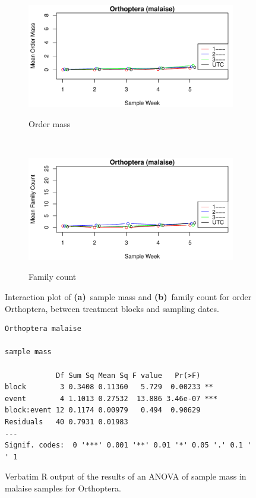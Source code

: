 \documentclass[10pt,letterpaper,twocolumn]{article}
\begin{document}
\begin{figure}[h]
	\centering
	\begin{subfigure}[b]{0.45\textwidth}
		\caption{Order mass}
		\includegraphics[width=\textwidth]{plots/blocks/interaction/mass/mass_malaise_Orthoptera_interplot.pdf}
		\label{fig:malaise_orthoptera_mass_interplot}
	\end{subfigure}
	~
	\begin{subfigure}[b]{0.45\textwidth}
		\caption{Family count}
		\includegraphics[width=\textwidth]{plots/blocks/interaction/family/family_malaise_Orthoptera_interplot.pdf}
		\label{fig:malaise_orthoptera_family_interplot}
	\end{subfigure}
	\caption{Interaction plot of \textbf{(a)}~sample mass and \textbf{(b)}~family count for order Orthoptera, between treatment blocks and sampling dates.}
	\label{fig:malaise_orthoptera_interplot}
	\smallskip
	\nointerlineskip
	\hrulefill
\end{figure}

\begin{figure}[h]
	\lstset{numbers=left}
	\lstset{xleftmargin=5mm,framexleftmargin=5mm}
	\begin{lstlisting}
Orthoptera malaise 

sample mass 

            Df Sum Sq Mean Sq F value   Pr(>F)    
block        3 0.3408 0.11360   5.729  0.00233 ** 
event        4 1.1013 0.27532  13.886 3.46e-07 ***
block:event 12 0.1174 0.00979   0.494  0.90629    
Residuals   40 0.7931 0.01983                     
---
Signif. codes:  0 '***' 0.001 '**' 0.01 '*' 0.05 '.' 0.1 ' ' 1
	\end{lstlisting}
	\caption{Verbatim R output of the results of an ANOVA of sample mass in malaise samples for Orthoptera.}
	\label{fig:malaise_orthoptera_mass_anova}
	\smallskip
	\nointerlineskip
	\hrulefill
\end{figure}
\end{document}
